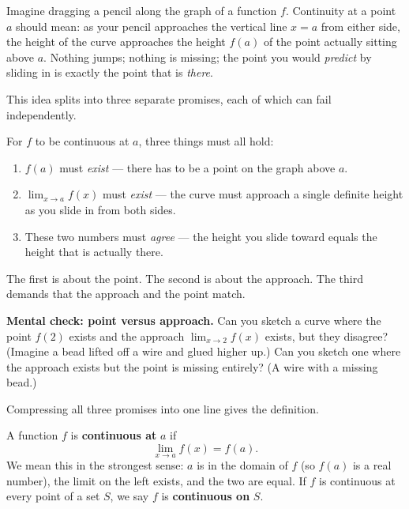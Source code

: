 Imagine dragging a pencil along the graph of a function $f$. Continuity at a point $a$
should mean: as your pencil approaches the vertical line $x=a$ from either side, the
height of the curve approaches the height $f(a)$ of the point actually sitting above $a$.
Nothing jumps; nothing is missing; the point you would \emph{predict} by sliding in is
exactly the point that is \emph{there}.

This idea splits into three separate promises, each of
which can fail independently.

\begin{intuitionbox}
For $f$ to be continuous at $a$, three things must all hold:
\begin{enumerate}
  \item $f(a)$ must \emph{exist} --- there has to be a point on the graph above $a$.
  \item $\lim_{x\to a} f(x)$ must \emph{exist} --- the curve must approach a
        single definite height as you slide in from both sides.
  \item These two numbers must \emph{agree} --- the height you slide toward equals the
        height that is actually there.
\end{enumerate}
The first is about the point. The second is about the approach. The third demands that
the approach and the point match.
\end{intuitionbox}

\begin{marginnotebox}
\textbf{Mental check: point versus approach.}
Can you sketch a curve where the point $f(2)$ exists and the approach $\lim_{x\to 2} f(x)$
exists, but they disagree? (Imagine a bead lifted off a wire and glued higher up.) Can you
sketch one where the approach exists but the point is missing entirely? (A wire with a missing bead.)
\end{marginnotebox}

Compressing all three promises into one line gives the definition.

\begin{definition}
\label{ch08:def-continuity}
A function $f$ is \textbf{continuous at} $a$ if
\[
  \lim_{x\to a} f(x) = f(a).
\]
We mean this in the strongest sense: $a$ is in the domain of $f$ (so $f(a)$ is a real
number), the limit on the left exists, and the two are equal. If $f$ is continuous at
every point of a set $S$, we say $f$ is \textbf{continuous on} $S$.
\end{definition}


